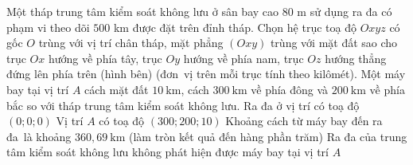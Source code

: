 \begin{ex}%
	Một tháp trung tâm kiểm soát không lưu ở sân bay cao $80$ m sử dụng ra đa có phạm vi theo dõi $500$ km được đặt trên đỉnh tháp. Chọn hệ trục toạ độ $Oxyz$ có gốc $O$  trùng với vị trí chân tháp, mặt phẳng $(Oxy)$ trùng với mặt đất sao cho trục $Ox$ hướng về phía tây, trục $O y$ hướng về phía nam, trục $O z$ hướng thẳng đứng lên phía trên (hình bên) (đơn~vị trên mỗi trục tính theo kilômét).
	Một máy bay tại vị trí $A$ cách mặt đất $10 \mathrm{~km}$, cách $300 \mathrm{~km}$ về phía đông và $200 \mathrm{~km}$ về  phía bắc so với tháp trung tâm kiểm soát không lưu.
	\choiceTF 
		{Ra đa ở  vị trí có toạ độ $(0; 0; 0)$}
		{Vị  trí $A$ có toạ độ $(300; 200; 10)$}
		{\True Khoảng cách từ máy bay đến ra đa~là khoảng $360,69 \mathrm{~km}$ (làm  tròn kết quả đến hàng phần trăm)}
		{Ra đa của trung tâm kiểm soát không lưu không phát hiện được  máy bay tại vị trí $A$}
\end{ex}

